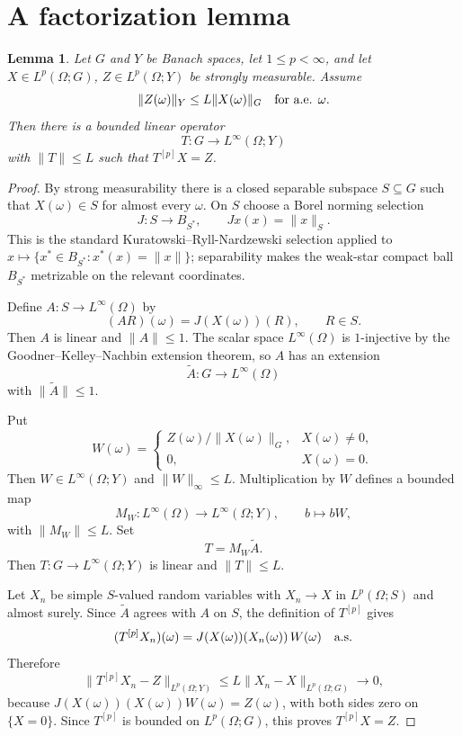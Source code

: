 \documentclass[11pt]{article}
\newtheorem{lemma}{Lemma}
\newcommand{\1}{\mathbf 1}
\begin{document}
\section*{A factorization lemma}

\begin{lemma}\label{lem:factor}
Let \(G\) and \(Y\) be Banach spaces, let \(1\leq p<\infty\), and let
\(X\in L^p(\Omega;G)\), \(Z\in L^p(\Omega;Y)\) be strongly measurable.  Assume
\[
  \|Z(\omega)\|_Y\leq L\|X(\omega)\|_G
  \quad\hbox{for a.e. }\omega .
\]
Then there is a bounded linear operator
\[
  T:G\to L^\infty(\Omega;Y)
\]
with \(\|T\|\leq L\) such that \(T^{[p]}X=Z\).
\end{lemma}

\begin{proof}
By strong measurability there is a closed separable subspace \(S\subseteq G\)
such that \(X(\omega)\in S\) for almost every \(\omega\).  On \(S\) choose a
Borel norming selection
\[
  J:S\to B_{S^*},\qquad Jx(x)=\|x\|_S .
\]
This is the standard Kuratowski--Ryll-Nardzewski selection applied to
\(x\mapsto\{x^*\in B_{S^*}:x^*(x)=\|x\|\}\); separability makes the weak-star
compact ball \(B_{S^*}\) metrizable on the relevant coordinates.

Define \(A:S\to L^\infty(\Omega)\) by
\[
  (AR)(\omega)=J(X(\omega))(R),\qquad R\in S.
\]
Then \(A\) is linear and \(\|A\|\leq1\).  The scalar space
\(L^\infty(\Omega)\) is \(1\)-injective by the Goodner--Kelley--Nachbin
extension theorem, so \(A\) has an extension
\[
  \widetilde A:G\to L^\infty(\Omega)
\]
with \(\|\widetilde A\|\leq1\).

Put
\[
  W(\omega)=
  \begin{cases}
    Z(\omega)/\|X(\omega)\|_G, & X(\omega)\neq0,\\[3pt]
    0, & X(\omega)=0 .
  \end{cases}
\]
Then \(W\in L^\infty(\Omega;Y)\) and \(\|W\|_\infty\leq L\).  Multiplication by
\(W\) defines a bounded map
\[
  M_W:L^\infty(\Omega)\to L^\infty(\Omega;Y),\qquad b\mapsto bW,
\]
with \(\|M_W\|\leq L\).  Set
\[
  T=M_W\widetilde A.
\]
Then \(T:G\to L^\infty(\Omega;Y)\) is linear and \(\|T\|\leq L\).

Let \(X_n\) be simple \(S\)-valued random variables with \(X_n\to X\) in
\(L^p(\Omega;S)\) and almost surely.  Since \(\widetilde A\) agrees with \(A\)
on \(S\), the definition of \(T^{[p]}\) gives
\[
  (T^{[p]}X_n)(\omega)
  =J(X(\omega))(X_n(\omega))\,W(\omega)
  \quad\hbox{a.s.}
\]
Therefore
\[
  \|T^{[p]}X_n-Z\|_{L^p(\Omega;Y)}
  \leq L\|X_n-X\|_{L^p(\Omega;G)}\to0,
\]
because \(J(X(\omega))(X(\omega))W(\omega)=Z(\omega)\), with both sides zero
on \(\{X=0\}\).  Since \(T^{[p]}\) is bounded on \(L^p(\Omega;G)\), this proves
\(T^{[p]}X=Z\).
\end{proof}
\end{document}
